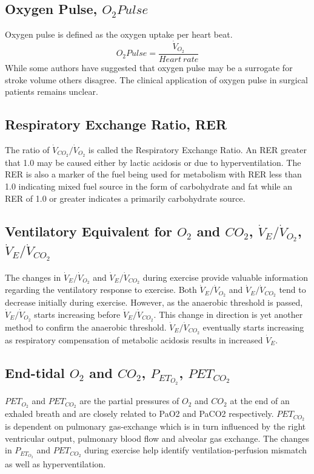 \subsection{Oxygen Pulse, $O_2Pulse$}
Oxygen pulse is defined as the oxygen uptake per heart beat.
\begin{equation} \label{eq:oxygen_pulse}
	O_2Pulse = \frac{\dot{V}_{O_2}}{Heart\ rate}
\end{equation}
While some authors have suggested that oxygen pulse may be a surrogate for stroke volume others disagree. The clinical application of oxygen pulse in surgical patients remains unclear.

\subsection{Respiratory Exchange Ratio, RER}
The ratio of $\dot{V}_{CO_2}/\dot{V}_{O_2}$ is called the Respiratory Exchange Ratio. An RER greater that 1.0 may be caused either by lactic acidosis or due to hyperventilation. The RER is also a marker of the fuel being used for metabolism with RER less than 1.0 indicating mixed fuel source in the form of carbohydrate and fat while an RER of 1.0 or greater indicates a primarily carbohydrate source.

\subsection{Ventilatory Equivalent for $O_2$ and $CO_2$, $\dot{V}_E/\dot{V}_{O_2}$, $\dot{V}_E/\dot{V}_{CO_2}$}
The changes in $\dot{V}_E/\dot{V}_{O_2}$ and $\dot{V}_E/\dot{V}_{CO_2}$ during exercise provide valuable information regarding the ventilatory response to exercise. Both $\dot{V}_E/\dot{V}_{O_2}$ and $\dot{V}_E/\dot{V}_{CO_2}$ tend to decrease initially during exercise. However, as the anaerobic threshold is passed, $\dot{V}_E/\dot{V}_{O_2}$ starts increasing before $\dot{V}_E/\dot{V}_{CO_2}$. This change in direction is yet another method to confirm the anaerobic threshold.  $\dot{V}_E/\dot{V}_{CO_2}$ eventually starts increasing as respiratory compensation of metabolic acidosis results in increased $\dot{V}_E$.

\subsection{End-tidal $O_2$ and $CO_2$, $P_{ET_{O_2}}$, $P{ET_{CO_2}}$}
$PET_{O_2}$ and $PET_{CO_2}$ are the partial pressures of $O_2$ and $CO_2$ at the end of an exhaled breath and are closely related to PaO2 and PaCO2 respectively. $P{ET_{CO_2}}$ is dependent on pulmonary gas-exchange which is in turn influenced by the right ventricular output, pulmonary blood flow and alveolar gas exchange. The changes in $P_{ET_{O_2}}$ and $P{ET_{CO_2}}$ during exercise help identify ventilation-perfusion mismatch as well as hyperventilation.

